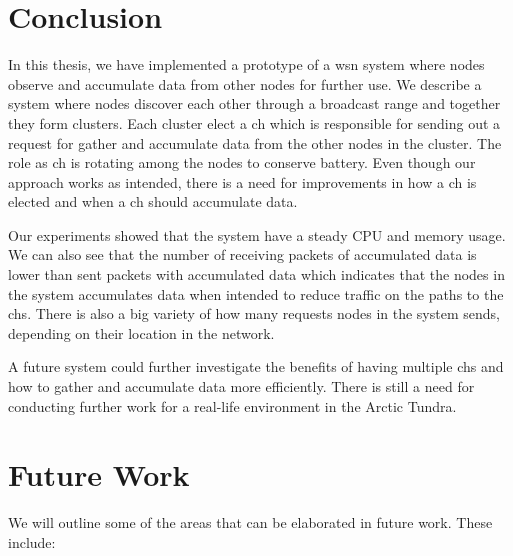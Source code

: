 \documentclass[USenglish]{uit-thesis}
\begin{document}
\chapter{Conclusion}
\glsresetall
In this thesis, we have implemented a prototype of a \gls{wsn} system where nodes observe and accumulate data from other nodes for further use. We describe a system where nodes discover each other through a broadcast range and together they form clusters. Each cluster elect  a \gls{ch} which is responsible for sending out a request for gather and accumulate data from the other nodes in the cluster. The role as \gls{ch} is rotating among the nodes to conserve battery. Even though our approach works as intended, there is a need for improvements in how a \gls{ch} is elected and when a \gls{ch} should accumulate data.

Our experiments showed that the system have a steady CPU and memory usage. We can also see that the number of receiving packets of accumulated data is lower than sent packets with accumulated data which indicates that the nodes in the system accumulates data when intended to reduce traffic on the paths to the \glspl{ch}. There is also a big variety of how many requests nodes in the system sends, depending on their location in the network.

A future system could further investigate the benefits of having multiple \glspl{ch} and how to gather and accumulate data more efficiently. There is still a need for conducting further work for a real-life environment in the Arctic Tundra.


\chapter{Future Work}
\glsresetall
We will outline some of the areas that can be elaborated in future work. These include:
\end{document}
